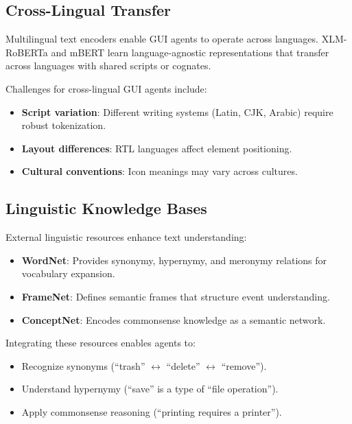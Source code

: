 \documentclass[11pt]{article}
\begin{document}
\subsection{Cross-Lingual Transfer}

Multilingual text encoders enable GUI agents to operate across languages. XLM-RoBERTa and mBERT learn language-agnostic representations that transfer across languages with shared scripts or cognates.

Challenges for cross-lingual GUI agents include:

\begin{itemize}
    \item \textbf{Script variation}: Different writing systems (Latin, CJK, Arabic) require robust tokenization.
    \item \textbf{Layout differences}: RTL languages affect element positioning.
    \item \textbf{Cultural conventions}: Icon meanings may vary across cultures.
\end{itemize}

\subsection{Linguistic Knowledge Bases}

External linguistic resources enhance text understanding:

\begin{itemize}
    \item \textbf{WordNet}: Provides synonymy, hypernymy, and meronymy relations for vocabulary expansion.
    \item \textbf{FrameNet}: Defines semantic frames that structure event understanding.
    \item \textbf{ConceptNet}: Encodes commonsense knowledge as a semantic network.
\end{itemize}

Integrating these resources enables agents to:

\begin{itemize}
    \item Recognize synonyms (``trash'' $\leftrightarrow$ ``delete'' $\leftrightarrow$ ``remove'').
    \item Understand hypernymy (``save'' is a type of ``file operation'').
    \item Apply commonsense reasoning (``printing requires a printer'').
\end{itemize}
\end{document}
